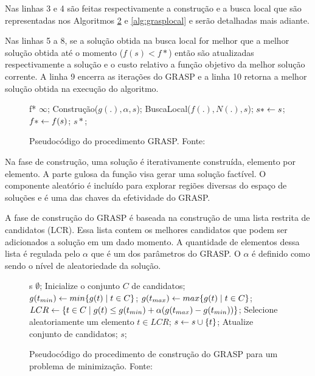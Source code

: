 Nas linhas 3 e 4 são feitas respectivamente a construção e a busca local que são
representadas nos Algoritmos \ref{alg:graspcons} e \ref{alg:grasplocal} e serão
detalhadas mais adiante.

Nas linhas 5 a 8, se a solução obtida na busca local for melhor que a melhor
solução obtida até o momento ($f(s) < f{*}$) então são atualizadas
respectivamente a solução e o custo relativo a função objetivo da melhor
solução corrente. A linha 9 encerra as iterações do GRASP e a linha 10 retorna a
melhor solução obtida na execução do algoritmo.

\begin{figure}[h]
\caption{Pseudocódigo do procedimento GRASP. \newline \mbox{Fonte:
\cite{resende1995}}}\label{alg:grasp}
\begin{programma}
\STATE f{*} \GETS $\infty$;
\STATE Construção($g(.), \alpha, s$);
\STATE BuscaLocal($f(.),N(.),s$);
\STATE $s{*} \leftarrow s$;
\STATE $f{*} \leftarrow f(s)$;
\ENDIF
\ENDFOR
\STATE\RETURN $s{*}$;
\ENDALGORITHM
\end{programma}
\end{figure}

Na fase de construção, uma solução é iterativamente construída, elemento por
elemento. A parte gulosa da função visa gerar uma solução factível. O
componente aleatório é incluído para explorar regiões diversas do espaço de
soluções e é uma das chaves da efetividade do GRASP.

A fase de construção do GRASP é baseada na construção de uma lista restrita de
candidatos (LCR). Essa lista contem os melhores candidatos que podem ser
adicionados a solução em um dado momento. A quantidade de elementos dessa lista
é regulada pelo $\alpha$ que é um dos parâmetros do GRASP. O $\alpha$ é
definido como sendo o nível de aleatoriedade da solução.

\begin{figure}[h]
\caption{Pseudocódigo do procedimento de construção do GRASP para um problema
de minimização. \newline \mbox{Fonte:
\cite{resende1995}}}\label{alg:graspcons}
\begin{programma}
\STATE s \GETS $\emptyset$;
\STATE Inicialize o conjunto $C$ de candidatos;
\STATE $g(t_{min}) \leftarrow min\{g(t) \mid t \in C\}$;
\STATE $g(t_{max}) \leftarrow max\{g(t) \mid t \in C\}$;
\STATE $LCR \leftarrow \{t \in C \mid g(t) \leq g(t_{min}) + \alpha(g(t_{max}) - g(t_{min}))\}$;
\STATE Selecione aleatoriamente um elemento $t \in LCR$;
\STATE $s \leftarrow s \cup \{t\}$;
\STATE Atualize conjunto de candidatos;
\ENDWHILE
\STATE\RETURN $s$;
\ENDALGORITHM
\end{programma}
\end{figure}

